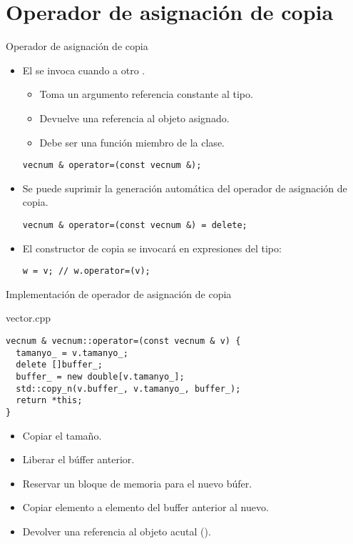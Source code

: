 \section{Operador de asignación de copia}

\begin{frame}[t,fragile]{Operador de asignación de copia}
\begin{itemize}
  \item El  se invoca cuando
         a otro .
    \begin{itemize}
      \item Toma un argumento referencia constante al tipo.
      \item Devuelve una referencia al objeto asignado.
      \item Debe ser una función miembro de la clase.
    \end{itemize}
\begin{lstlisting}
vecnum & operator=(const vecnum &);
\end{lstlisting}

  \item Se puede suprimir la generación automática del operador de asignación de copia.
\begin{lstlisting}
vecnum & operator=(const vecnum &) = delete;
\end{lstlisting}

  \item El constructor de copia se invocará en expresiones del tipo:
\begin{lstlisting}
w = v; // w.operator=(v);
\end{lstlisting}
\end{itemize}
\end{frame}

\begin{frame}[t,fragile]{Implementación de operador de asignación de copia}
\begin{block}{vector.cpp}
\begin{lstlisting}
vecnum & vecnum::operator=(const vecnum & v) {
  tamanyo_ = v.tamanyo_;
  delete []buffer_;
  buffer_ = new double[v.tamanyo_];
  std::copy_n(v.buffer_, v.tamanyo_, buffer_);
  return *this;
}
\end{lstlisting}
\end{block}

\begin{itemize}
  \item Copiar el tamaño.
  \item Liberar el búffer anterior.
  \item Reservar un bloque de memoria para el nuevo búfer.
  \item Copiar elemento a elemento del buffer anterior al nuevo.
  \item Devolver una referencia al objeto acutal ().
\end{itemize}
\end{frame}


